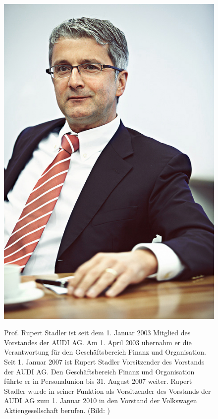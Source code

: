\documentclass[12pt]{article}
\begin{document}
\begin{figure}[!h]
	\centering
	\begin{minipage}[h]{0.20\textwidth}
		\centering
		\includegraphics[width=1.0\textwidth]{images/RupertStadler.jpg}
		\label{fig:vorstandvw8}
	\end{minipage}
	\begin{minipage}[h]{0.10\textwidth}
		\hspace{1cm} 
	\end{minipage}
	\begin{minipage}[h]{0.65\textwidth}
		Prof. Rupert Stadler ist seit dem 1. Januar 2003 Mitglied des Vorstandes der AUDI AG. Am 1. April 2003 übernahm er die Verantwortung für den Geschäftsbereich Finanz und Organisation. Seit 1. Januar 2007 ist Rupert Stadler Vorsitzender des Vorstands der AUDI AG. Den Geschäftsbereich Finanz und Organisation führte er in Personalunion bis 31. August 2007 weiter. Rupert Stadler wurde in seiner Funktion als Vorsitzender des Vorstands der AUDI AG zum 1. Januar 2010 in den Vorstand der Volkswagen Aktiengesellschaft berufen. (Bild: \cite{rspic} )
	\end{minipage}
\end{figure}
\cite{vorstand}
\end{document}
